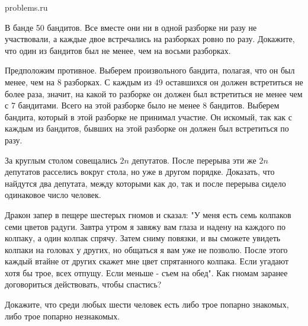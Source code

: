 \documentclass[11pt, a4paper]{common/document_template}
\begin{document}
\begin{titlepage}
  \begin{center}
	\Huge{problems.ru}
  \end{center}
\end{titlepage}   

\begin{exercise}
В банде 50 бандитов. Все вместе они ни в одной разборке ни разу не участвовали, а каждые двое встречались на разборках ровно по разу. Докажите, что один из бандитов был не менее, чем на восьми разборках.
\end{exercise}

\begin{Solution}
Предположим противное. Выберем произвольного бандита, полагая, что он был менее, чем на 8 разборках. С каждым из 49 оставшихся он должен встретиться не более раза, значит, на какой то разборке он должен был встретиться не менее чем с 7 бандитами. Всего на этой разборке было не менее 8 бандитов. Выберем бандита, который в этой разборке не принимал участие. Он искомый, так как с каждым из бандитов, бывших на этой разборке он должен был встретиться по разу. 
\end{Solution}

\begin{exercise}
За круглым столом совещались $2n$ депутатов. После перерыва эти же $2n$ депутатов расселись вокруг стола, но уже в другом порядке. Доказать, что найдутся два депутата, между которыми как до, так и после перерыва сидело одинаковое число человек.
\end{exercise}

\begin{exercise}
Дракон запер в пещере шестерых гномов и сказал: "У меня есть семь колпаков семи цветов радуги. Завтра утром я завяжу вам глаза и надену на каждого по колпаку, а один колпак спрячу. Затем сниму повязки, и вы сможете увидеть колпаки на головах у других, но общаться я вам уже не позволю. После этого каждый втайне от других скажет мне цвет спрятанного колпака. Если угадают хотя бы трое, всех отпущу. Если меньше - съем на обед". Как гномам заранее договориться действовать, чтобы спастись?
\end{exercise}

\begin{Solution}
\end{Solution}

\begin{exercise}
Докажите, что среди любых шести человек есть либо трое попарно знакомых, либо трое попарно незнакомых.
\end{exercise}
\end{document}
